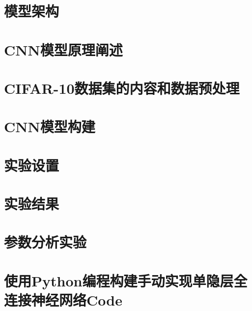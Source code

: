 \documentclass[12pt]{article}
\begin{document}
\section{模型架构}





\section{CNN模型原理阐述}
\section{CIFAR-10数据集的内容和数据预处理}

\section{CNN模型构建}

\section{实验设置}


\section{实验结果}


\section{参数分析实验}



\newpage
\appendix
\section{使用Python编程构建手动实现单隐层全连接神经网络Code}
\end{document}
